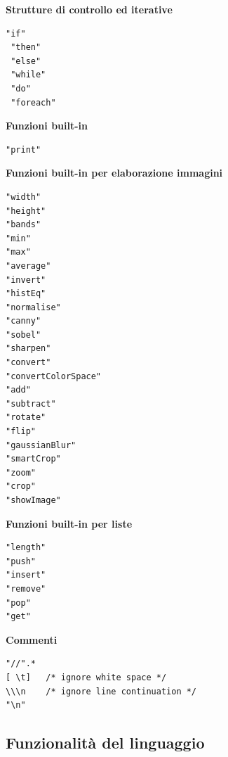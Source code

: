 \documentclass[10pt]{article}
\begin{document}
\textbf{Strutture di controllo ed iterative}
\begin{lstlisting}[breaklines=true, postbreak=\mbox{{$\hookrightarrow$}\space}]
 "if"   
 "then"  
 "else" 
 "while" 
 "do"    
 "foreach" 
\end{lstlisting}

\textbf{Funzioni built-in}
\begin{lstlisting}[breaklines=true, postbreak=\mbox{{$\hookrightarrow$}\space}]
"print"     
\end{lstlisting}

\textbf{Funzioni built-in per elaborazione immagini}
\begin{lstlisting}[breaklines=true, postbreak=\mbox{{$\hookrightarrow$}\space}]
"width"             
"height"            
"bands"             
"min"               
"max"               
"average"           
"invert"            
"histEq"            
"normalise"         
"canny"             
"sobel"             
"sharpen"          
"convert"           
"convertColorSpace" 
"add"               
"subtract"        
"rotate"           
"flip"          
"gaussianBlur"    
"smartCrop"        
"zoom"             
"crop"             
"showImage"               
\end{lstlisting}


\textbf{Funzioni built-in per liste}
\begin{lstlisting}[breaklines=true, postbreak=\mbox{{$\hookrightarrow$}\space}]
"length"           
"push"             
"insert"           
"remove"            
"pop"               
"get"               
\end{lstlisting}

\textbf{Commenti}
\begin{lstlisting}[breaklines=true, postbreak=\mbox{{$\hookrightarrow$}\space}]
"//".*  
[ \t]   /* ignore white space */ 
\\\n    /* ignore line continuation */
"\n"  
\end{lstlisting}

\subsection{Funzionalità del linguaggio}
\end{document}
